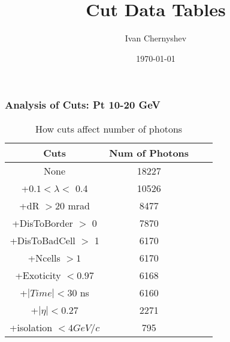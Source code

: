\documentclass{beamer}
\title{Cut Data Tables}
\author{Ivan Chernyshev}
\date{\today}
\begin{document}
 

\frame 
{ 
\frametitle{Analysis of Cuts: Pt 10-20 GeV} 
\begin{table} 
\caption{How cuts affect number of photons} 
\centering 
\begin{tabular}{c c c c} 
\hline\hline 
Cuts & Num of Photons\\ [0.5ex] 
\hline
None & 18227\\
+$0.1 < \lambda <$ 0.4 & 10526\\
+dR $> 20$ mrad & 8477\\
+DisToBorder $>$ 0 & 7870\\
+DisToBadCell $>$ 1 & 6170\\
+Ncells $> 1$ & 6170\\
+Exoticity $< 0.97$ & 6168\\
+$|Time| < 30$ ns & 6160\\
+$|\eta| < 0.27$ & 2271\\
+isolation $< 4 GeV/c$ &  795\\
[1ex] 
\hline 
\end{tabular} 
\label{table:nonlin} 
\end{table} 
} 
\end{document}
